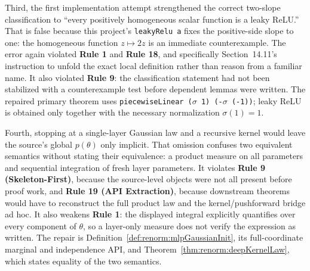 Third, the first implementation attempt strengthened the correct two-slope classification to
``every positively homogeneous scalar function is a leaky ReLU.''  That is false because this
project's \texttt{leakyRelu a} fixes the positive-side slope to one: the homogeneous function
$z\mapsto2z$ is an immediate counterexample.  The error again violated \textbf{Rule 1} and
\textbf{Rule 18}, and specifically Section~14.11's instruction to unfold the exact local
definition rather than reason from a familiar name.  It also violated \textbf{Rule 9}: the
classification statement had not been stabilized with a counterexample test before dependent
lemmas were written.  The repaired primary theorem uses
\texttt{piecewiseLinear ($\sigma$ 1) (-$\sigma$ (-1))}; leaky ReLU is obtained only together with the necessary
normalization $\sigma(1)=1$.

Fourth, stopping at a single-layer Gaussian law and a recursive kernel would leave the source's
global $p(\theta)$ only implicit.  That omission confuses two equivalent semantics without stating
their equivalence: a product measure on all parameters and sequential integration of fresh layer
parameters.  It violates \textbf{Rule 9 (Skeleton-First)}, because the source-level objects were not
all present before proof work, and \textbf{Rule 19 (API Extraction)}, because downstream theorems
would have to reconstruct the full product law and the kernel/pushforward bridge ad hoc.  It also
weakens \textbf{Rule 1}: the displayed integral explicitly quantifies over every component of
$\theta$, so a layer-only measure does not verify the expression as written.  The repair is
Definition~\ref{def:renorm:mlpGaussianInit}, its full-coordinate marginal and independence API, and
Theorem~\ref{thm:renorm:deepKernelLaw}, which states equality of the two semantics.

